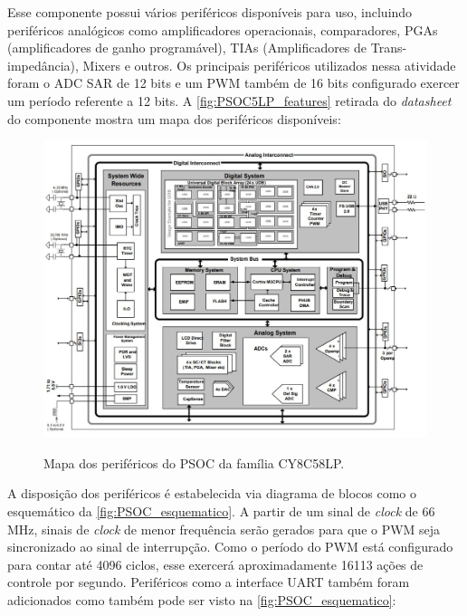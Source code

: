 \documentclass[
	article,			%
	11pt,				%
	oneside,			%
	a4paper,			%
	english,			%
	brazil,				%
	sumario=tradicional
	]{abntex2}
\begin{document}
Esse componente possui vários periféricos disponíveis para uso, incluindo periféricos analógicos como amplificadores operacionais, comparadores, PGAs (amplificadores de ganho programável), TIAs (Amplificadores de Trans-impedância), Mixers e outros. Os principais periféricos utilizados nessa atividade foram o ADC SAR de 12 bits e um PWM também de 16 bits configurado exercer um período referente a 12 bits.
A \autoref{fig:PSOC5LP_features} retirada do \textit{datasheet} do componente mostra um mapa dos periféricos disponíveis:
\begin{figure}[htb!]
	\centering
	\caption{Mapa dos periféricos do PSOC da família CY8C58LP.}
	\includegraphics[scale=0.55]{./img/PSOC5LP_features.JPG}
	\label{fig:PSOC5LP_features}
\end{figure}

\pagebreak

A disposição dos periféricos é estabelecida via diagrama de blocos como o esquemático da \autoref{fig:PSOC_esquematico}.
A partir de um sinal de \textit{clock} de 66 MHz, sinais de \textit{clock} de menor frequência serão gerados para que o PWM seja sincronizado ao sinal de interrupção. Como o período do PWM está configurado para contar até 4096 ciclos, esse exercerá aproximadamente 16113 ações de controle por segundo.  
Periféricos como a interface UART também foram adicionados como também pode ser visto na \autoref{fig:PSOC_esquematico}:
\end{document}
